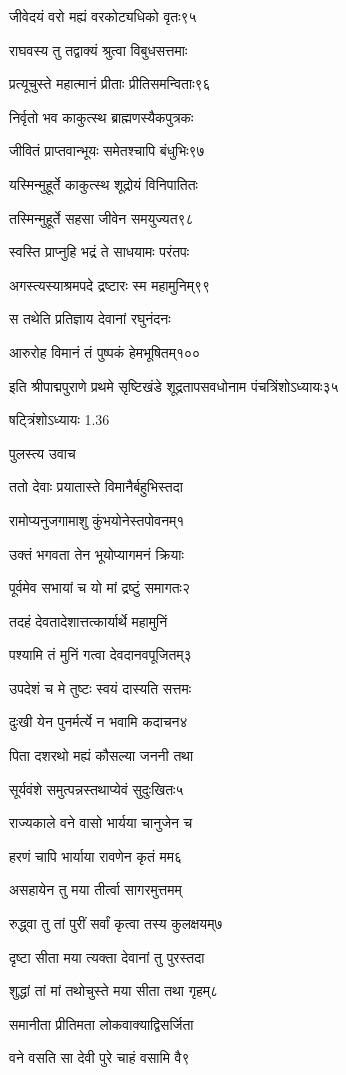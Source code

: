 जीवेदयं वरो मह्यं वरकोट्यधिको वृतः९५

राघवस्य तु तद्वाक्यं श्रुत्वा विबुधसत्तमाः

प्रत्यूचुस्ते महात्मानं प्रीताः प्रीतिसमन्विताः९६

निर्वृतो भव काकुत्स्थ ब्राह्मणस्यैकपुत्रकः

जीवितं प्राप्तवान्भूयः समेतश्चापि बंधुभिः९७

यस्मिन्मुहूर्ते काकुत्स्थ शूद्रोयं विनिपातितः

तस्मिन्मुहूर्ते सहसा जीवेन समयुज्यत९८

स्वस्ति प्राप्नुहि भद्रं ते साधयामः परंतपः

अगस्त्यस्याश्रमपदे द्रष्टारः स्म महामुनिम्९९

स तथेति प्रतिज्ञाय देवानां रघुनंदनः

आरुरोह विमानं तं पुष्पकं हेमभूषितम्१००

इति श्रीपाद्मपुराणे प्रथमे सृष्टिखंडे शूद्रतापसवधोनाम पंचत्रिंशोऽध्यायः३५

षट्त्रिंशोऽध्यायः 1.36

पुलस्त्य उवाच

ततो देवाः प्रयातास्ते विमानैर्बहुभिस्तदा

रामोप्यनुजगामाशु कुंभयोनेस्तपोवनम्१

उक्तं भगवता तेन भूयोप्यागमनं क्रियाः

पूर्वमेव सभायां च यो मां द्रष्टुं समागतः२

तदहं देवतादेशात्तत्कार्यार्थे महामुनिं

पश्यामि तं मुनिं गत्वा देवदानवपूजितम्३

उपदेशं च मे तुष्टः स्वयं दास्यति सत्तमः

दुःखी येन पुनर्मर्त्ये न भवामि कदाचन४

पिता दशरथो मह्यं कौसल्या जननी तथा

सूर्यवंशे समुत्पन्नस्तथाप्येवं सुदुःखितः५

राज्यकाले वने वासो भार्यया चानुजेन च

हरणं चापि भार्याया रावणेन कृतं मम६

असहायेन तु मया तीर्त्वा सागरमुत्तमम्

रुद्ध्वा तु तां पुरीं सर्वां कृत्वा तस्य कुलक्षयम्७

दृष्टा सीता मया त्यक्ता देवानां तु पुरस्तदा

शुद्धां तां मां तथोचुस्ते मया सीता तथा गृहम्८

समानीता प्रीतिमता लोकवाक्याद्विसर्जिता

वने वसति सा देवी पुरे चाहं वसामि वै९

